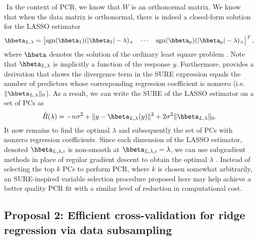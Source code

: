 $ $\newline
In the context of PCR, we know that $W$ is an orthonormal matrix. We know that when the data matrix is orthonormal, there is indeed a closed-form solution for the LASSO estimator
\[
\hbeta_{L,\lambda} = \begin{bmatrix} \sgn(\hbeta_1)(|\hbeta_1| - \lambda)_+ & \cdots & \sgn(\hbeta_p)(|\hbeta_p| - \lambda)_+ \end{bmatrix}^T,
\]
where $\hbeta$ denotes the solution of the ordinary least square problem \citep{gauraha2018introduction}. Note that $\hbeta_{L,\lambda}$ is implicitly a function of the response $y$. Furthermore, \citet{tibshirani2015stein} provides a derivation that shows the divergence term in the SURE expression equals the number of predictors whose corresponding regression coefficient is nonzero (i.e. $\|\hbeta_{L,\lambda}\|_0$). As a result, we can write the SURE of the LASSO estimator on a set of PCs as 
\[
\hat{R}(\lambda) = -n\sigma^2 + \| y - \hbeta_{L,\lambda}(y) \|^2 + 2\sigma^2\|\hbeta_{L,\lambda}\|_0.
\]
It now remains to find the optimal $\lambda$ and subsequently the set of PCs with nonzero regression coefficients. Since each dimension of the LASSO estimator, denoted $\hbeta_{L,\lambda,i}$ is non-smooth at $\hbeta_{L,\lambda,i} = \lambda$, we can use subgradient methods in place of regular gradient descent to obtain the optimal $\lambda$ \citep{shor2012minimization}. Instead of selecting the top $k$ PCs to perform PCR, where $k$ is chosen somewhat arbitrarily, an SURE-inspired variable selection procedure proposed here may help achieve a better quality PCR fit with a similar level of reduction in computational cost.

\pagebreak

\subsection{Proposal 2: Efficient cross-validation for ridge regression via data subsampling} %

